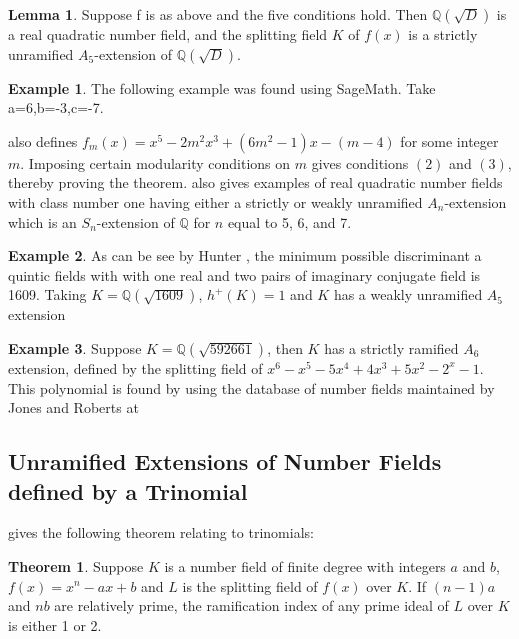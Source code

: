 \documentclass[12pt]{extarticle}
\newcommand{\Q}{\mathbb{Q}}
\newcommand{\<}{\langle}
\renewcommand{\>}{\rangle}
\theoremstyle{definition}
\newtheorem{theorem}{Theorem}
\newtheorem*{example}{Example}
\newtheorem{lemma}{Lemma}
\begin{document}
\begin{lemma}
Suppose f is as above and the five conditions hold. Then $\Q(\sqrt{D})$ is a real quadratic number field, and the splitting field $K$ of $f(x) $ is a strictly unramified $A_5$-extension of $\Q(\sqrt{D})$. 
\end{lemma}
\begin{example}
    The following example was found using SageMath. Take a=6,b=-3,c=-7. 
\end{example}
\cite{YAMAMURA2} also defines $f_m(x)= x^5-2m^2x^3+(6m^2-1)x-(m-4)$ for some integer $m$. Imposing certain modularity conditions on $m$ gives conditions $(2)$ and $(3)$, thereby proving the theorem. 
\cite{YAMAMURA2} also gives examples of real quadratic number fields with class number one having either a strictly or weakly unramified $A_n$-extension which is an $S_n$-extension of $\Q$ for $n$ equal to 5, 6, and 7. 
\begin{example}
As can be see by Hunter \cite{HUNTER}, the minimum possible discriminant a quintic fields with with one real and two pairs of imaginary conjugate field is 1609. 
Taking $K=\Q(\sqrt{1609})$, $h^{+}(K)=1$ and $K$ has a weakly unramified $A_5$ extension
\end{example}
\begin{example}
Suppose $K=\Q(\sqrt{592661})$, then $K$ has a strictly ramified $A_6$ extension, defined by the splitting field of  $x^6 - x^5 - 5x^4 + 4x^3 + 5x^2 - 2^x - 1$. This polynomial is found by using the database of number fields maintained by Jones and Roberts at \cite{JONE2}
\end{example}
\subsection{Unramified Extensions of Number Fields defined by a Trinomial}
\cite{uchida1970} gives the following theorem relating to trinomials:
\begin{theorem}
Suppose $K$ is a number field of finite degree with integers $a$ and $b$, $f(x) = x^n-ax+b$ and $L$ is the splitting field of $f(x)$ over $K$. If $(n-1)a$ and $nb$ are relatively prime, the ramification index of any prime ideal of $L$ over $K$ is either 1 or 2. 
\end{theorem}
\end{document}
